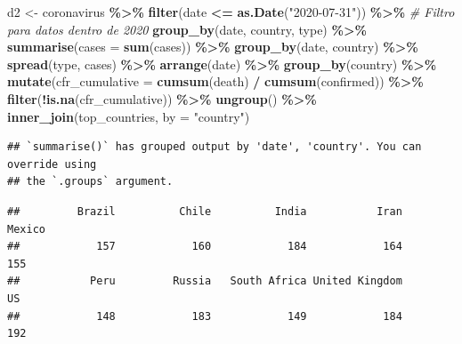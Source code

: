 \documentclass[
]{article}
\newenvironment{Shaded}{\begin{snugshade}}{\end{snugshade}}
\newcommand{\AttributeTok}[1]{\textcolor[rgb]{0.13,0.29,0.53}{#1}}
\newcommand{\CommentTok}[1]{\textcolor[rgb]{0.56,0.35,0.01}{\textit{#1}}}
\newcommand{\FunctionTok}[1]{\textcolor[rgb]{0.13,0.29,0.53}{\textbf{#1}}}
\newcommand{\NormalTok}[1]{#1}
\newcommand{\OtherTok}[1]{\textcolor[rgb]{0.56,0.35,0.01}{#1}}
\newcommand{\SpecialCharTok}[1]{\textcolor[rgb]{0.81,0.36,0.00}{\textbf{#1}}}
\newcommand{\StringTok}[1]{\textcolor[rgb]{0.31,0.60,0.02}{#1}}
\begin{document}
\begin{Shaded}
\begin{Highlighting}[]
\NormalTok{d2 }\OtherTok{\textless{}{-}}\NormalTok{ coronavirus }\SpecialCharTok{\%\textgreater{}\%}
  \FunctionTok{filter}\NormalTok{(date }\SpecialCharTok{\textless{}=} \FunctionTok{as.Date}\NormalTok{(}\StringTok{"2020{-}07{-}31"}\NormalTok{)) }\SpecialCharTok{\%\textgreater{}\%}  \CommentTok{\# Filtro para datos dentro de 2020}
  \FunctionTok{group\_by}\NormalTok{(date, country, type) }\SpecialCharTok{\%\textgreater{}\%}
  \FunctionTok{summarise}\NormalTok{(}\AttributeTok{cases =} \FunctionTok{sum}\NormalTok{(cases)) }\SpecialCharTok{\%\textgreater{}\%}
  \FunctionTok{group\_by}\NormalTok{(date, country) }\SpecialCharTok{\%\textgreater{}\%}
  \FunctionTok{spread}\NormalTok{(type, cases) }\SpecialCharTok{\%\textgreater{}\%}
  \FunctionTok{arrange}\NormalTok{(date) }\SpecialCharTok{\%\textgreater{}\%}
  \FunctionTok{group\_by}\NormalTok{(country) }\SpecialCharTok{\%\textgreater{}\%}
  \FunctionTok{mutate}\NormalTok{(}\AttributeTok{cfr\_cumulative =} \FunctionTok{cumsum}\NormalTok{(death) }\SpecialCharTok{/} \FunctionTok{cumsum}\NormalTok{(confirmed)) }\SpecialCharTok{\%\textgreater{}\%}
  \FunctionTok{filter}\NormalTok{(}\SpecialCharTok{!}\FunctionTok{is.na}\NormalTok{(cfr\_cumulative)) }\SpecialCharTok{\%\textgreater{}\%}
  \FunctionTok{ungroup}\NormalTok{() }\SpecialCharTok{\%\textgreater{}\%}
  \FunctionTok{inner\_join}\NormalTok{(top\_countries, }\AttributeTok{by =} \StringTok{"country"}\NormalTok{) }
\end{Highlighting}
\end{Shaded}

\begin{verbatim}
## `summarise()` has grouped output by 'date', 'country'. You can override using
## the `.groups` argument.
\end{verbatim}

\begin{Shaded}
\end{Shaded}

\begin{verbatim}
##         Brazil          Chile          India           Iran         Mexico 
##            157            160            184            164            155 
##           Peru         Russia   South Africa United Kingdom             US 
##            148            183            149            184            192
\end{verbatim}
\end{document}
